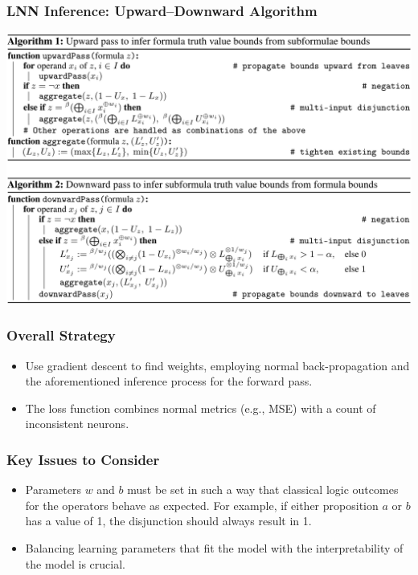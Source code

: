 \documentclass{beamer}
\begin{document}
\begin{frame}
  \frametitle{LNN Inference: Upward--Downward Algorithm}
  \includegraphics[width=\textwidth]{lnn3.png}
\end{frame}

\begin{frame}
\frametitle{Overall Strategy}
\begin{itemize}
    \item Use gradient descent to find weights, employing normal
      back-propagation and the aforementioned inference process for
      the forward pass.
    \item The loss function combines normal metrics (e.g., MSE) with a
      count of inconsistent neurons.
\end{itemize}
\end{frame}

\begin{frame}
\frametitle{Key Issues to Consider}
\begin{itemize}
    \item Parameters \(w\) and \(b\) must be set in such a way that
      classical logic outcomes for the operators behave as
      expected. For example, if either proposition \(a\) or \(b\) has
      a value of 1, the disjunction should always result in 1.
    \item Balancing learning parameters that fit the model with the
      interpretability of the model is crucial.
\end{itemize}
\end{frame}
\end{document}
